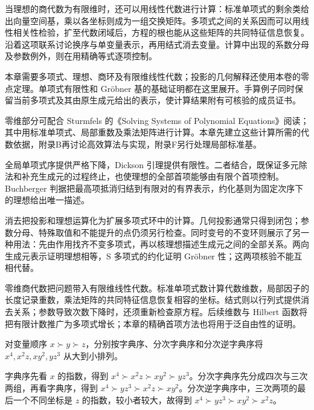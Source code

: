 \ProseParagraphBreak

当理想的商代数为有限维时，还可以用线性代数进行计算：标准单项式的剩余类给出向量空间基，乘以各坐标则成为一组交换矩阵。多项式之间的关系因而可以用线性相关性检验，扩至代数闭域后，方程的根也能从这些矩阵的共同特征信息恢复。沿着这项联系讨论换序与单变量表示，再用结式消去变量。计算中出现的系数分母及参数例外，则在用精确等式逐项控制。

\ProseParagraphBreak
本章需要多项式、理想、商环及有限维线性代数；投影的几何解释还使用本卷的零点定理。单项式有限性和 Gröbner 基的基础证明都在这里展开。手算例子同时保留当前多项式及其由原生成元给出的表示，使计算结果附有可核验的成员证书。

\ProseParagraphBreak
零维部分可配合 Sturmfels 的《Solving Systems of Polynomial Equations》\cite[Sections 2.1--2.3, pp. 13--19]{Sturmfels2002PolynomialEquations}阅读；其中用标准单项式、局部重数及乘法矩阵进行计算。本章先建立这些计算所需的代数依据，附录B再讨论高效算法与实现，附录F另行处理局部标准基。









\begin{chaptersummary}
	全局单项式序提供严格下降，Dickson 引理提供有限性。二者结合，既保证多元除法和补充生成元的过程终止，也使理想的全部首项能够由有限个首项控制。Buchberger 判据把最高项抵消归结到有限对的有界表示，约化基则为固定次序下的理想给出唯一描述。

	\ProseParagraphBreak
	消去把投影和理想运算化为扩展多项式环中的计算。几何投影通常只得到闭包；参数分母、特殊取值和不能提升的点仍须另行检查。同时变号的不变环则展示了另一种用法：先由作用找齐不变多项式，再以核理想描述生成元之间的全部关系。两向生成元表示证明理想相等，S 多项式的约化证明 Gröbner 性；这两项核验不能互相代替。

	\ProseParagraphBreak
	零维商代数把问题带入有限维线性代数。标准单项式数计算代数维数，局部因子的长度记录重数，乘法矩阵的共同特征信息恢复相容的坐标。结式则以行列式提供消去关系；参数导致次数下降时，还须重新检查原方程。后续维数与 Hilbert 函数将把有限计数推广为多项式增长；本章的精确首项方法也将用于泛自由性的证明。
\end{chaptersummary}

\BookExercises

\begin{exercise}\label{b3:ex:08-three-orders}
	对变量顺序 \(x\succ y\succ z\)，分别按字典序、分次字典序和分次逆字典序将 \(x^4,x^2z,xy^2,yz^3\) 从大到小排列。
\end{exercise}
\begin{solution}
	字典序先看 \(x\) 的指数，得到 \(x^4\succ x^2z\succ xy^2\succ yz^3\)。分次字典序先分成四次与三次两组，再看字典序，得到 \(x^4\succ yz^3\succ x^2z\succ xy^2\)。分次逆字典序中，三次两项的最后一个不同坐标是 \(z\) 的指数，较小者较大，故得到 \(x^4\succ yz^3\succ xy^2\succ x^2z\)。
\end{solution}

